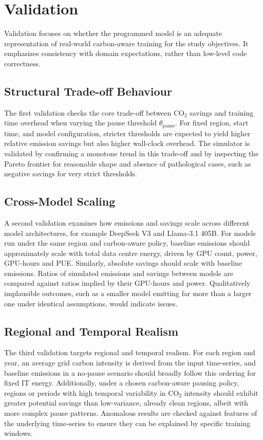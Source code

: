 \section{Validation}

Validation focuses on whether the programmed model is an adequate
representation of real-world carbon-aware training for the study objectives.
It emphasizes consistency with domain
expectations, rather than low-level code correctness.

\subsection{Structural Trade-off Behaviour}

The first validation checks the core trade-off between CO$_2$ savings and
training time overhead when varying the pause threshold
$\theta_{\text{pause}}$. For fixed region, start time, and model
configuration, stricter thresholds are expected to yield higher relative
emission savings but also higher wall-clock overhead. The simulator is
validated by confirming a monotone trend in this trade-off and by inspecting
the Pareto frontier for reasonable shape and absence of pathological cases,
such as negative savings for very strict thresholds.

\subsection{Cross-Model Scaling}

A second validation examines how emissions and savings scale across different
model architectures, for example DeepSeek V3 and Llama‑3.1 405B. For models
run under the same region and carbon-aware policy, baseline emissions should
approximately scale with total data centre energy, driven by GPU count, power,
GPU-hours and PUE. Similarly, absolute savings should scale with baseline
emissions. Ratios of simulated emissions and savings between models are
compared against ratios implied by their GPU-hours and power. Qualitatively
implausible outcomes, such as a smaller model emitting far more than a larger
one under identical assumptions, would indicate issues.

\subsection{Regional and Temporal Realism}

The third validation targets regional and temporal realism. For each region
and year, an average grid carbon intensity is derived from the input
time-series, and baseline emissions in a no-pause scenario should broadly
follow this ordering for fixed IT energy. Additionally, under a chosen
carbon-aware pausing policy, regions or periods with high temporal variability
in CO$_2$ intensity should exhibit greater potential savings than low-variance,
already clean regions, albeit with more complex pause patterns. Anomalous
results are checked against features of the underlying time-series to ensure
they can be explained by specific training windows.

